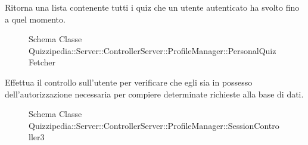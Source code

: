 Ritorna una lista contenente tutti i quiz che un utente autenticato ha svolto fino a quel momento.
\begin{figure}[H]
\centering
\noindent{}
\caption{Schema Classe Quizzipedia::Server::ControllerServer::ProfileManager::PersonalQuizFetcher}
\end{figure}
Effettua il controllo sull'utente per verificare che egli sia in possesso dell'autorizzazione necessaria per compiere determinate richieste alla base di dati.
\begin{figure}[H]
\centering
\noindent{}
\caption{Schema Classe Quizzipedia::Server::ControllerServer::ProfileManager::SessionController3}
\end{figure}
